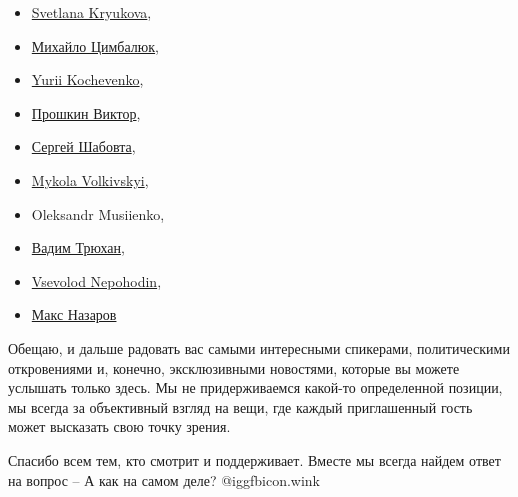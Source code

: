 \begin{multicols}{3}
\begin{itemize}
  \item \href{https://www.facebook.com/kryukova}{Svetlana Kryukova},
  \item \href{https://www.facebook.com/myhaylocymbalyk}{Михайло Цимбалюк}, 
  \item \href{https://www.facebook.com/Kochevenko}{Yurii Kochevenko}, 
  \item \href{https://www.facebook.com/profile.php?id=100046439387901}{Прошкин Виктор}, 
  \item \href{https://www.facebook.com/profile.php?id=100023534419447}{Сергей Шабовта}, 
  \item \href{https://www.facebook.com/nickolas.volkovski}{Mykola Volkivskyi}, 
  \item Oleksandr Musiienko, 
  \item \href{https://www.facebook.com/vadymholub}{Вадим Трюхан}, 
  \item \href{https://www.facebook.com/npgd101}{Vsevolod Nepohodin},
  \item \href{https://www.facebook.com/maks.nazaroff}{Макс Назаров}
\end{itemize}
\end{multicols}

Обещаю, и дальше радовать вас самыми интересными спикерами, политическими
откровениями и, конечно, эксклюзивными новостями, которые вы можете услышать
только здесь. Мы не придерживаемся какой-то определенной позиции, мы всегда за
объективный взгляд на вещи, где каждый приглашенный гость может высказать свою
точку зрения.

Спасибо всем тем, кто смотрит и поддерживает. Вместе мы всегда найдем ответ на
вопрос – А как на самом деле?  @igg{fbicon.wink} 
